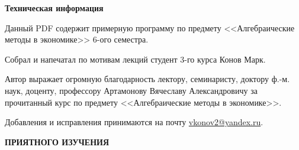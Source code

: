 \pagestyle{fancy}

\begin{center}
	{\Large \textbf{Техническая информация}}
\end{center}

\vspace{0.5cm}
Данный PDF содержит примерную программу по предмету <<Алгебраические методы в экономике>> 6-ого семестра.

\vspace{0.5cm}
Собрал и напечатал по мотивам лекций студент 3-го курса Конов Марк.

\vspace{0.5cm}
Автор выражает огромную благодарность лектору, семинаристу, доктору ф.-м. наук, доценту, профессору Артамонову Вячеславу Александровичу за прочитанный курс по предмету <<Алгебраические методы в экономике>>.

\vspace{0.5cm}
Добавления и исправления принимаются на почту \href{}{vkonov2@yandex.ru}.

\vspace{0.5cm}
\begin{center}
	{\Large \textbf{ПРИЯТНОГО ИЗУЧЕНИЯ}}
\end{center}

\newpage

